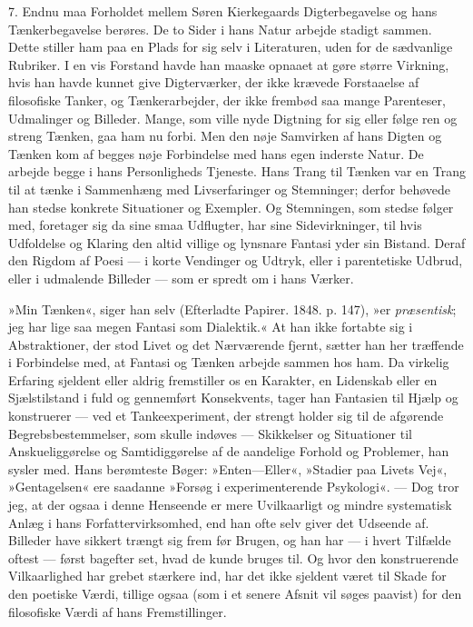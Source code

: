 \documentclass[12pt,a4paper,openany]{book}
\newcommand{\opage}[1]{\marginnote{\footnotesize\textit{[#1]}}}
\begin{document}
7. Endnu maa Forholdet mellem Søren Kierkegaards
Digterbegavelse og hans Tænkerbegavelse berøres. De
to Sider i hans Natur arbejde stadigt sammen. Dette
stiller ham paa en Plads for sig selv i Literaturen, uden
for de sædvanlige Rubriker. I en vis Forstand havde
han maaske opnaaet at gøre større Virkning, hvis han
havde kunnet give Digterværker, der ikke krævede Forstaaelse
af filosofiske Tanker, og Tænkerarbejder, der
ikke frembød saa mange Parenteser, Udmalinger og Billeder.
Mange, som ville nyde Digtning for sig eller følge
ren og streng Tænken, gaa ham nu forbi. Men den
nøje Samvirken af hans Digten og Tænken kom af begges
nøje Forbindelse med hans egen inderste Natur. De arbejde
begge i hans Personligheds Tjeneste. Hans Trang
til Tænken var en Trang til at tænke i Sammenhæng
med Livserfaringer og Stemninger; derfor behøvede han
stedse konkrete Situationer og Exempler. Og Stemningen,
som stedse følger med, foretager sig da sine smaa Udflugter,
har sine Sidevirkninger, til hvis Udfoldelse og
Klaring den altid villige og lynsnare Fantasi yder sin
Bistand. Deraf den Rigdom af Poesi --- i korte Vendinger
og Udtryk, eller i parentetiske Udbrud, eller i udmalende
Billeder --- som er spredt om i hans Værker.

»Min Tænken«, siger han selv (Efterladte Papirer.
1848. p. 147), »er \textit{præsentisk}; jeg har lige saa megen
Fantasi som Dialektik.« At han ikke fortabte sig i Abstraktioner,
der stod Livet og det Nærværende fjernt,
sætter han her træffende i Forbindelse med, at Fantasi
og Tænken arbejde sammen hos ham. Da virkelig Erfaring
sjeldent eller aldrig fremstiller os en Karakter, en
Lidenskab eller en Sjælstilstand i fuld og gennemført
Konsekvents, tager han Fantasien til Hjælp og konstruerer
\opage{50}--- ved et Tankeexperiment, der strengt holder sig til de
afgørende Begrebsbestemmelser, som skulle indøves ---
Skikkelser og Situationer til Anskueliggørelse og Samtidiggørelse
af de aandelige Forhold og Problemer, han
sysler med. Hans berømteste Bøger: »Enten---Eller«,
»Stadier paa Livets Vej«, »Gentagelsen« ere saadanne
»Forsøg i experimenterende Psykologi«. --- Dog tror jeg,
at der ogsaa i denne Henseende er mere Uvilkaarligt og
mindre systematisk Anlæg i hans Forfattervirksomhed,
end han ofte selv giver det Udseende af. Billeder have
sikkert trængt sig frem før Brugen, og han har --- i
hvert Tilfælde oftest --- først bagefter set, hvad de kunde
bruges til. Og hvor den konstruerende Vilkaarlighed
har grebet stærkere ind, har det ikke sjeldent været til
Skade for den poetiske Værdi, tillige ogsaa (som i et
senere Afsnit vil søges paavist) for den filosofiske Værdi
af hans Fremstillinger.
\end{document}
